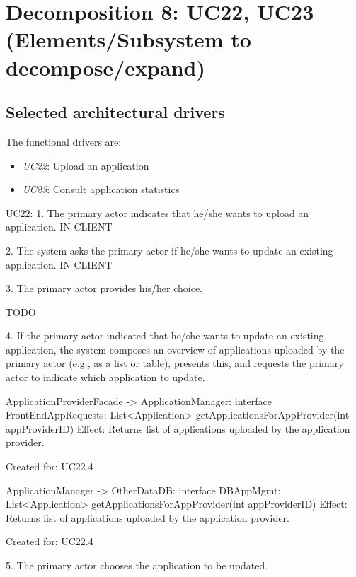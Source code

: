 \section{Decomposition 8: UC22, UC23 (Elements/Subsystem to decompose/expand)}


\subsection{Selected architectural drivers}
    The functional drivers are:
    \begin{itemize}
        \item \emph{UC22}: Upload an application
        \item \emph{UC23}: Consult application statistics
    \end{itemize}

    UC22:
        1. The primary actor indicates that he/she wants to upload an application.
            IN CLIENT

        2. The system asks the primary actor if he/she wants to update an existing application.
            IN CLIENT

        3. The primary actor provides his/her choice.

            TODO

        4. If the primary actor indicated that he/she wants to update an existing application,
           the system composes an overview of applications uploaded by the primary actor
           (e.g., as a list or table), presents this, and requests the primary actor to indicate which application to update.

            ApplicationProviderFacade -> ApplicationManager: interface FrontEndAppRequests:
                                                List<Application> getApplicationsForAppProvider(int appProviderID)
                Effect: Returns list of applications uploaded by the application provider.
                \item Created for: UC22.4

            ApplicationManager -> OtherDataDB: interface DBAppMgmt:
                                                List<Application> getApplicationsForAppProvider(int appProviderID)
                Effect: Returns list of applications uploaded by the application provider.
                \item Created for: UC22.4


        5. The primary actor chooses the application to be updated.

